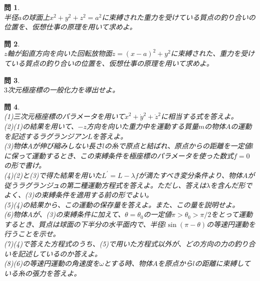 \documentclass{jsarticle}
\newtheorem{pro}{問}[section]
\begin{document}
\begin{pro}~\\
半径\(a\)の球面上\(x^{2}+y^{2}+z^{2}=a^{2}\)に束縛された重力を受けている質点の釣り合いの位置を、仮想仕事の原理を用いて求めよ。
\end{pro}

\begin{pro}~\\
\(z\)軸が鉛直方向を向いた回転放物面\(z=(x-a)^{2}+y^{2}\)に束縛された、重力を受けている質点の釣り合いの位置を、仮想仕事の原理を用いて求めよ。
\end{pro}

\begin{pro}~\\
\(3\)次元極座標の一般化力を導出せよ。
\end{pro}

\begin{pro}~\\
(1)三次元極座標のパラメータを用いて\(\dot{x}^{2}+\dot{y}^{2}+\dot{z}^{2}\)に相当する式を答えよ。\\
(2)(1)の結果を用いて、\(-z\)方向を向いた重力中を運動する質量\(m\)の物体\(A\)の運動を記述するラグランジアン\(L\)を答えよ。\\
(3)物体\(A\)が伸び縮みしない長さ\(l\)の糸で原点と結ばれ、原点からの距離を一定値\(l\)に保って運動するとき、この束縛条件を極座標のパラメータを使った数式\(f=0\)の形で書け。\\
(4)(2)と(3)で得た結果を用いた\(L^{\prime}=L-\lambda f\)が満たすべき変分条件より、物体\(A\)が従うラグランジュの第二種運動方程式を答えよ。ただし、答えは\(\lambda\)を含んだ形でよく、(3)の束縛条件を適用する前の形でよい。\\
(5)(4)の結果から、この運動の保存量を答えよ。また、この量を説明せよ。\\
(6)物体\(A\)が、(3)の束縛条件に加えて、\(\theta=\theta_{0}\)の一定値\(\pi>\theta_{0}>\pi/2\)をとって運動するとき、質点は球面の下半分の水平面内で、半径\(l\sin(\pi-\theta)\)の等速円運動を行うことを示せ。\\
(7)(4)で答えた方程式のうち、(5)で用いた方程式以外が、どの方向の力の釣り合いを記述しているのか答えよ。\\
(8)(6)の等速円運動の角速度を\(\omega\)とする時、物体\(A\)を原点から\(l\)の距離に束縛している糸の張力を答えよ。
\end{pro}
\end{document}
